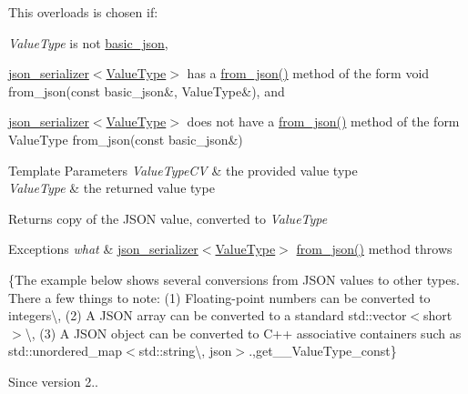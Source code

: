 This overloads is chosen if\+:
\begin{DoxyItemize}
\item {\itshape Value\+Type} is not \hyperlink{classnlohmann_1_1basic__json}{basic\+\_\+json},
\item \hyperlink{classnlohmann_1_1basic__json_a7768841baaaa7a21098a401c932efaff}{json\+\_\+serializer$<$\+Value\+Type$>$} has a {\ttfamily \hyperlink{namespacenlohmann_1_1detail_a8b99ec9b29f3f20a18fc4281fb784e49}{from\+\_\+json()}} method of the form {\ttfamily void from\+\_\+json(const basic\+\_\+json\&, Value\+Type\&)}, and
\item \hyperlink{classnlohmann_1_1basic__json_a7768841baaaa7a21098a401c932efaff}{json\+\_\+serializer$<$\+Value\+Type$>$} does not have a {\ttfamily \hyperlink{namespacenlohmann_1_1detail_a8b99ec9b29f3f20a18fc4281fb784e49}{from\+\_\+json()}} method of the form {\ttfamily Value\+Type from\+\_\+json(const basic\+\_\+json\&)}
\end{DoxyItemize}


\begin{DoxyTemplParams}{Template Parameters}
{\em Value\+Type\+CV} & the provided value type \\
\hline
{\em Value\+Type} & the returned value type\\
\hline
\end{DoxyTemplParams}
\begin{DoxyReturn}{Returns}
copy of the J\+S\+ON value, converted to {\itshape Value\+Type} 
\end{DoxyReturn}

\begin{DoxyExceptions}{Exceptions}
{\em what} & \hyperlink{classnlohmann_1_1basic__json_a7768841baaaa7a21098a401c932efaff}{json\+\_\+serializer$<$\+Value\+Type$>$} {\ttfamily \hyperlink{namespacenlohmann_1_1detail_a8b99ec9b29f3f20a18fc4281fb784e49}{from\+\_\+json()}} method throws\\
\hline
\end{DoxyExceptions}
\{The example below shows several conversions from J\+S\+ON values to other types. There a few things to note\+: (1) Floating-\/point numbers can be converted to integers\textbackslash{}, (2) A J\+S\+ON array can be converted to a standard {\ttfamily std\+::vector$<$short$>$}\textbackslash{}, (3) A J\+S\+ON object can be converted to C++ associative containers such as {\ttfamily std\+::unordered\+\_\+map$<$std\+::string\textbackslash{}, json$>$}.,get\+\_\+\+\_\+\+Value\+Type\+\_\+const\}

\begin{DoxySince}{Since}
version 2.. 
\end{DoxySince}


